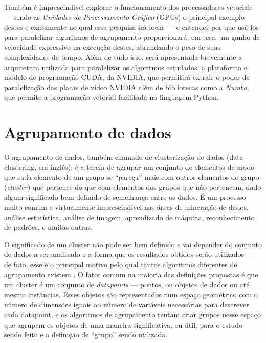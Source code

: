\documentclass[12pt, %
openright, 
oneside, %
a4paper,    %
brazil]{facom-ufu-abntex2}
\begin{document}
Também é imprescindível explorar o funcionamento dos processadores vetoriais --- sendo as \textit{Unidades de Processamento Gráfico} (GPUs) o principal exemplo destes e exatamente no qual essa pesquisa irá focar --- e entender por que usá-los para paralelizar algoritmos de agrupamento proporcionará, em tese, um ganho de velocidade expressivo na execução destes, abrandando o peso de suas complexidades de tempo. Além de tudo isso, será apresentada brevemente a arquitetura utilizada para paralelizar os algoritmos estudados: a plataforma e modelo de programação CUDA, da NVIDIA, que permitirá extrair o poder de paralelização das placas de vídeo NVIDIA além de bibliotecas como a \textit{Numba}, que permite a programação vetorial facilitada na linguagem Python.





\section{Agrupamento de dados}

O agrupamento de dados, também chamado de clusterização de dados (data clustering, em inglês), é a tarefa de agrupar um conjunto de elementos de modo que cada elemento de um grupo se \enquote{pareça} mais com outros elementos do grupo (\textit{cluster}) que pertence do que com elementos dos grupos que não pertencem, dado algum significado bem definido de semelhança entre os dados. É um processo muito comum e virtualmente imprescindível nas áreas de mineração de dados, análise estatística, análise de imagem, aprendizado de máquina, reconhecimento de padrões, e muitas outras.

O significado de um cluster não pode ser bem definido e vai depender do conjunto de dados a ser analisado e a forma que os resultados obtidos serão utilizados --- de fato, esse é o principal motivo pelo qual tantos algoritmos diferentes de agrupamento existem \cite{SoManyClustAlg}. O fator comum na maioria das definições propostas é que um cluster é um conjunto de \textit{datapoints} --- pontos, ou objetos de dados ou até mesmo instâncias. Esses objetos são representados num espaço geométrico com o número de dimensões iguais ao número de variáveis necessárias para descrever cada datapoint, e os algoritmos de agrupamento tentam criar grupos nesse espaço que agrupem os objetos de uma maneira significativa, ou útil, para o estudo sendo feito e a definição de \enquote{grupo} sendo utilizada.
\end{document}
